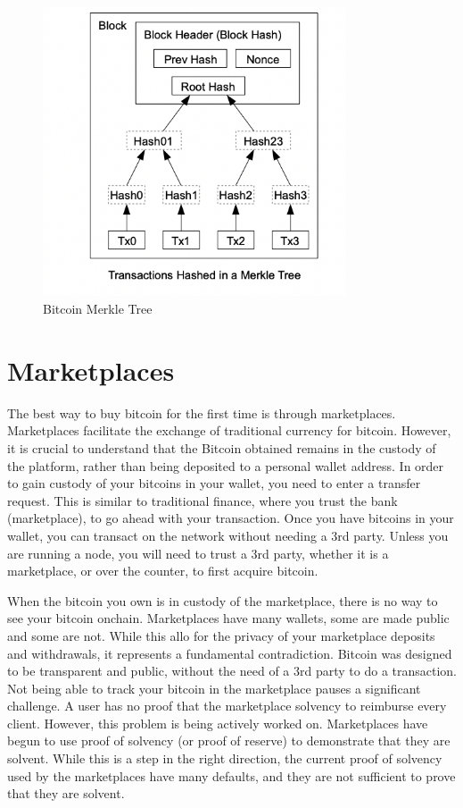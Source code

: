 \begin{figure}[ht!]
\centering
\includegraphics[width=90mm]{MerkleTree.png}
\caption{Bitcoin Merkle Tree \cite{N08}}
\label{overflow}
\end{figure}




\section{Marketplaces}
The best way to buy bitcoin for the first time is through marketplaces. Marketplaces facilitate the exchange of traditional currency for bitcoin.
However, it is crucial to understand that the Bitcoin obtained remains in the custody of the platform, rather than being deposited to a personal wallet address.
In order to gain custody of your bitcoins in your wallet, you need to enter a transfer request. This is similar to traditional finance, where you trust the bank (marketplace), to
go ahead with your transaction. Once you have bitcoins in your wallet, you can transact on the network without needing a 3rd party.
Unless you are running a node, you will need to trust a 3rd party, whether it is a marketplace, or over the counter, to first acquire bitcoin.


When the bitcoin you own is in custody of the marketplace, there is no way to see your bitcoin onchain. Marketplaces have many wallets, some are made public and some are not.
While this allo for the privacy of your marketplace deposits and withdrawals, it represents a fundamental contradiction. Bitcoin was designed to be transparent and public, without the need of a 3rd party to do a transaction.
Not being able to track your bitcoin in the marketplace pauses a significant challenge. A user has no proof that the marketplace solvency to reimburse
every client.
However, this problem is being actively worked on. Marketplaces have begun to use proof of solvency (or proof of reserve) to demonstrate that they are solvent.
While this is a step in the right direction, the current proof of solvency used by the marketplaces have many defaults, and they are not sufficient to prove that they are solvent.




